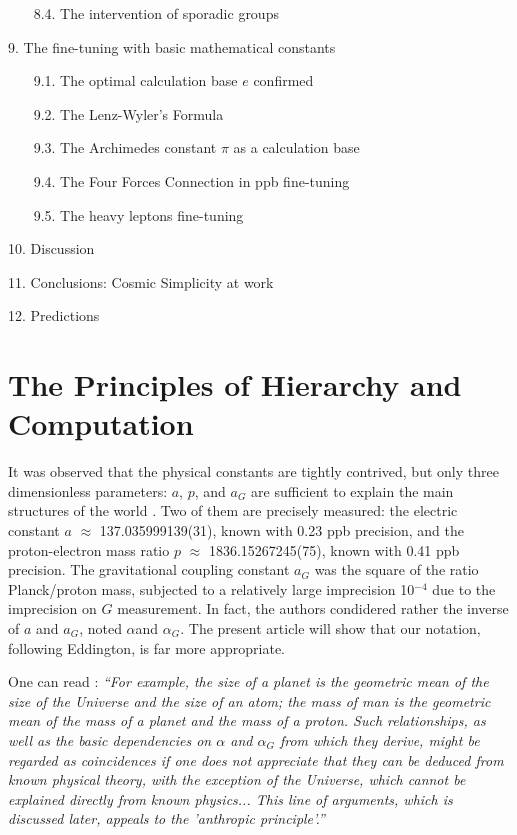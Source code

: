\documentclass[twoside,draft]{article}
\begin{document}
\begin{sloppypar}
~~~    8.4. The intervention of sporadic groups
   
 9. The fine-tuning with basic mathematical constants
 
~~~    9.1. The optimal calculation base $e$ confirmed
   
~~~    9.2. The Lenz-Wyler's Formula
   
~~~    9.3. The Archimedes constant $\pi$ as a calculation base
   
~~~    9.4. The Four Forces Connection in ppb fine-tuning
   
~~~    9.5. The heavy leptons fine-tuning
   
 10. Discussion
 
 11. Conclusions: Cosmic Simplicity at work
 
 12. Predictions
    
\section{The Principles of Hierarchy and Computation}

It was observed that the physical constants are tightly contrived, but only three dimensionless parameters: $a$, $p$, and $a_{G}$ are sufficient to explain the main structures of the world \cite{Carr}. Two of them are precisely measured: the electric constant $a$ $\approx$ 137.035999139(31), known with 0.23 ppb precision, and the proton-electron mass ratio $p$ $\approx$ 1836.15267245(75), known with 0.41 ppb precision. The gravitational coupling constant $a_{G}$ was the square of the ratio Planck/proton mass, subjected to a relatively large imprecision 10$^{-4}\!$ due to the imprecision on $G$ measurement. In fact, the authors condidered rather the inverse of $a$ and $a_G$, noted $\alpha$and $\alpha_G$. The present article will show that our notation, following Eddington, is far more appropriate.

One can read \cite{Carr}: \textit{“For example, the size of a planet is the geometric mean of the size of the Universe and the size of an atom; the mass of man is the geometric mean of the mass of a planet and the mass of a proton. Such relationships, as well as the basic dependencies on $\alpha$ and $\alpha_G$ from which they derive, might be regarded as coincidences if one does not appreciate that they can be deduced from known physical theory, with the exception of the Universe, which cannot be explained directly from known physics... This line of arguments, which is discussed later, appeals to the 'anthropic principle'.”}


\end{sloppypar}
\end{document}
